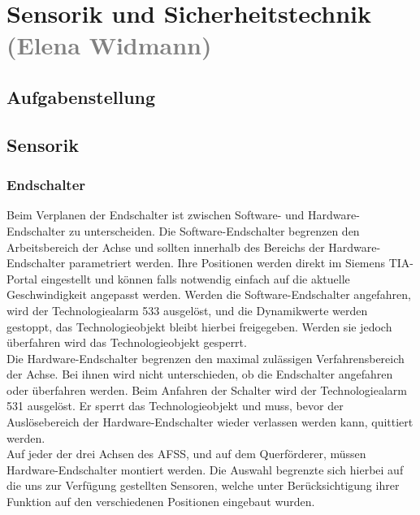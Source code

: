 \section{Sensorik und Sicherheitstechnik \textcolor{gray}{(Elena Widmann)}}

\subsection{Aufgabenstellung}

\subsection{Sensorik}

\subsubsection{Endschalter}
Beim Verplanen der Endschalter ist zwischen Software- und Hardware-Endschalter zu unterscheiden. Die Software-Endschalter begrenzen den Arbeitsbereich der Achse und sollten innerhalb des Bereichs der Hardware-Endschalter parametriert werden. Ihre Positionen werden direkt im Siemens TIA-Portal eingestellt und können falls notwendig einfach auf die aktuelle Geschwindigkeit angepasst werden. Werden die Software-Endschalter angefahren, wird der Technologiealarm 533 ausgelöst, und die Dynamikwerte werden gestoppt, das Technologieobjekt bleibt hierbei freigegeben. Werden sie jedoch überfahren wird das Technologieobjekt gesperrt. \\
Die Hardware-Endschalter begrenzen den maximal zulässigen Verfahrensbereich der Achse. Bei ihnen wird nicht unterschieden, ob die Endschalter angefahren oder überfahren werden. Beim Anfahren der Schalter wird der Technologiealarm 531 ausgelöst. Er sperrt das Technologieobjekt und muss, bevor der Auslösebereich der Hardware-Endschalter wieder verlassen werden kann, quittiert werden. \cite{axis_manual}\\
Auf jeder der drei Achsen des AFSS, und auf dem Querförderer, müssen Hardware-Endschalter montiert werden. Die Auswahl begrenzte sich hierbei auf die uns zur Verfügung gestellten Sensoren, welche unter Berücksichtigung ihrer Funktion auf den verschiedenen Positionen eingebaut wurden.

